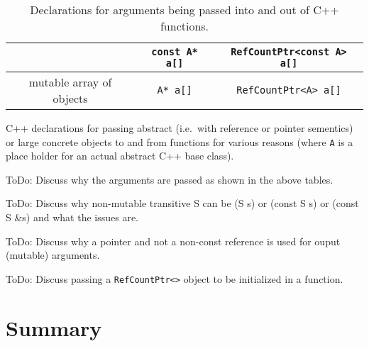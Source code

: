 \begin{table}
\begin{minipage}{\textwidth}
\begin{tabular}{|c|c|c|}
& \texttt{const A* a[]}
& \texttt{RefCountPtr<const A> a[]} \\
\hline
mutable array of objects
& \texttt{A* a[]}
& \texttt{RefCountPtr<A> a[]} \\
\hline
\end{tabular}
\begin{center}
C++ declarations for passing abstract (i.e.~with reference or pointer
sementics) or large concrete objects to and from functions for various
reasons (where \texttt{A} is a place holder for an actual abstract C++
base class).
\end{center}
\end{minipage}
%
\caption{Declarations for arguments being passed into and out of C++ functions.}
%
\end{table}

ToDo: Discuss why the arguments are passed as shown in the above
tables.

ToDo: Discuss why non-mutable transitive S can be (S s) or (const S s)
or (const S \&s) and what the issues are.

ToDo: Discuss why a pointer and not a non-const reference is used for
ouput (mutable) arguments.

ToDo: Discuss passing a \texttt{RefCountPtr<>} object to be initialized in a
function.

%
\section{Summary}
%
